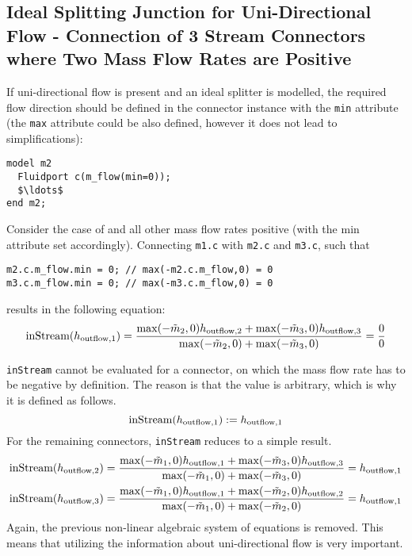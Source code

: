 \subsection{Ideal Splitting Junction for Uni-Directional Flow - Connection of 3 Stream Connectors where Two Mass Flow Rates are Positive}\label{connection-of-3-stream-connectors-where-two-mass-flow-rates-are-positive-ideal-splitting-junction-for-uni-directional-flow}\label{ideal-splitting-junction-for-uni-directional-flow-connection-of-3-stream-connectors-where-two-mass-flow-rates-are-positive}

If uni-directional flow is present and an ideal splitter is modelled,
the required flow direction should be defined in the connector instance
with the \lstinline!min! attribute (the \lstinline!max! attribute could be also defined,
however it does not lead to simplifications):
\begin{lstlisting}[language=modelica]
model m2
  Fluidport c(m_flow(min=0));
  $\ldots$
end m2;
\end{lstlisting}

Consider the case of and all other mass flow rates positive (with the
min attribute set accordingly). Connecting \lstinline!m1.c! with \lstinline!m2.c! and \lstinline!m3.c!, such
that
\begin{lstlisting}[language=modelica]
m2.c.m_flow.min = 0; // max(-m2.c.m_flow,0) = 0
m3.c.m_flow.min = 0; // max(-m3.c.m_flow,0) = 0
\end{lstlisting}
results in the following equation:
\begin{equation*}
\text{\lstinline!inStream!}(h_{\mathrm{outflow},1})=\frac{\operatorname{max}(-\tilde{m}_2,0)h_{\mathrm{outflow},2}+\operatorname{max}(-\tilde{m}_3,0)h_{\mathrm{outflow},3}}{\operatorname{max}(-\tilde{m}_2,0)+\operatorname{max}(-\tilde{m}_3,0)}=\frac{0}{0}
\end{equation*}

\lstinline!inStream! cannot be evaluated for a connector, on which
the mass flow rate has to be negative by definition. The reason is that
the value is arbitrary, which is why it is defined as follows.
\begin{equation*}
\text{\lstinline!inStream!}(h_{\mathrm{outflow},1}):=h_{\mathrm{outflow},1}
\end{equation*}
For the remaining connectors, \lstinline!inStream! reduces to a simple result.
\begin{align*}
\text{\lstinline!inStream!}(h_{\mathrm{outflow},2}) &= \frac{\operatorname{max}(-\tilde{m}_1,0)h_{\mathrm{outflow},1}+\operatorname{max}(-\tilde{m}_3,0)h_{\mathrm{outflow},3}}{\operatorname{max}(-\tilde{m}_1,0)+\operatorname{max}(-\tilde{m}_3,0)}
  = h_{\mathrm{outflow},1}\\
\text{\lstinline!inStream!}(h_{\mathrm{outflow},3}) &= \frac{\operatorname{max}(-\tilde{m}_1,0)h_{\mathrm{outflow},1}+\operatorname{max}(-\tilde{m}_2,0)h_{\mathrm{outflow},2}}{\operatorname{max}(-\tilde{m}_1,0)+\operatorname{max}(-\tilde{m}_2,0)}
  = h_{\mathrm{outflow},1}
\end{align*}
Again, the previous non-linear algebraic system of equations is removed.
This means that utilizing the information about uni-directional flow is
very important.

